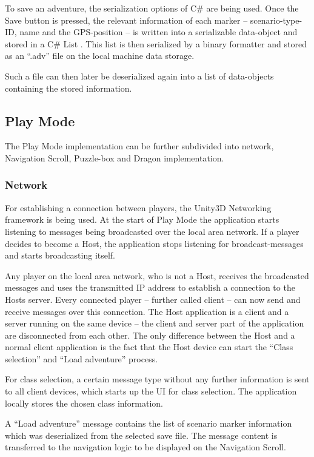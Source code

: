 \documentclass{sigchi-ext}
\begin{document}
To save an adventure, the serialization options of C\# \cite{serialization} are being used. Once the Save button is pressed, the relevant information of each marker -- scenario-type-ID, name and the GPS-position -- is written into a serializable data-object and stored in a C\# List \cite{listClass}. This list is then serialized by a binary formatter \cite{binaryFormatterClass} and stored as an ``.adv'' file on the local machine data storage.

Such a file can then later be deserialized again into a list of data-objects containing the stored information.

\subsection{\textbf{Play Mode}}

The Play Mode implementation can be further subdivided into network, Navigation Scroll, Puzzle-box and Dragon implementation.

\subsubsection{Network}

For establishing a connection between players, the Unity3D Networking framework \cite{unityNetworking} is being used. At the start of Play Mode the application starts listening to messages being broadcasted over the local area network. If a player decides to become a Host, the application stops listening for broadcast-messages and starts broadcasting itself.

Any player on the local area network, who is not a Host, receives the broadcasted messages and uses the transmitted IP address to establish a connection to the Hosts server. Every connected player -- further called client -- can now send and receive messages over this connection. The Host application is a client and a server running on the same device -- the client and server part of the application are disconnected from each other. The only difference between the Host and a normal client application is the fact that the Host device can start the ``Class selection'' and ``Load adventure'' process. 

For class selection, a certain message type without any further information is sent to all client devices, which starts up the UI for class selection. The application locally stores the chosen class information.

A ``Load adventure'' message contains the list of scenario marker information which was deserialized from the selected save file. The message content is transferred to the navigation logic to be displayed on the Navigation Scroll.
\end{document}
